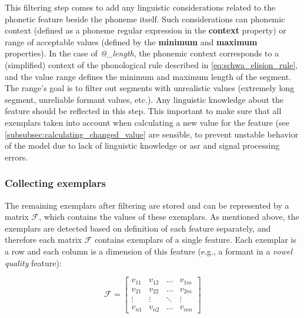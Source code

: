 This filtering step comes to add any linguistic considerations related to the phonetic feature beside the phoneme itself.
Such considerations can phonemic context (defined as a phoneme regular expression in the \textbf{context} property) or range of acceptable values (defined by the \textbf{minimum} and \textbf{maximum} properties).
In the case of \textit{@\_length}, the phonemic context corresponds to a (simplified) context of the phonological rule described in \cref{eq:schwa_elision_rule}, and the value range defines the minimum and maximum length of the segment.
The range's goal is to filter out segments with unrealistic values (extremely long segment, unreliable formant values, etc.).
Any linguistic knowledge about the feature should be reflected in this step.
This important to make sure that all exemplars taken into account when calculating a new value for the feature (see \cref{subsubsec:calculating_changed_value} are sensible, to prevent unstable behavior of the model due to lack of linguistic knowledge or \ac{asr} and signal processing errors.

\subsubsection{Collecting exemplars}
\label{subsubsec:collecting_exemplars}


The remaining exemplars after filtering are stored and can be represented by a matrix $\mathcal{F}$, which contains the values of these exemplars.
As mentioned above, the exemplars are detected based on definition of each feature separately, and therefore each matrix $\mathcal{F}$ contains exemplars of a single feature.
Each exemplar is a row and each column is a dimension of this feature (e.g., a formant in a \textit{vowel quality} feature):

\begin{equation}
\label{eq:feature_matrix}
\mathcal{F} =
\begin{bmatrix} 
v_{11} & v_{12} & \dots  & v_{1m}\\
v_{21} & v_{22} & \dots  & v_{2m} \\
\vdots & \vdots & \ddots & \vdots \\
v_{n1} & v_{n2} & \dots  & v_{nm} 
\end{bmatrix}
\end{equation}

